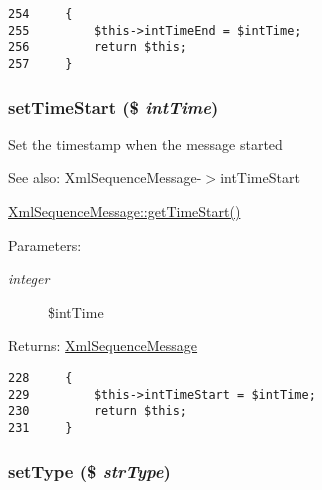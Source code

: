 \begin{Code}\begin{verbatim}254     {
255         $this->intTimeEnd = $intTime;
256         return $this;
257     }
\end{verbatim}
\end{Code}


\hypertarget{class_xml_sequence_message_60d6f4557ab43800fe80fb113d0ccc1c}{
\subsubsection[{setTimeStart}]{\setlength{\rightskip}{0pt plus 5cm}setTimeStart (\$ {\em intTime})}}
\label{class_xml_sequence_message_60d6f4557ab43800fe80fb113d0ccc1c}


Set the timestamp when the message started

\begin{Desc}
\item[See also:]XmlSequenceMessage-$>$intTimeStart 

\hyperlink{class_xml_sequence_message_bb950915c967cab83e55f46db3d44169}{XmlSequenceMessage::getTimeStart()} \end{Desc}
\begin{Desc}
\item[Parameters:]
\begin{description}
\item[{\em integer}]\$intTime \end{description}
\end{Desc}
\begin{Desc}
\item[Returns:]\hyperlink{class_xml_sequence_message}{XmlSequenceMessage} \end{Desc}


\begin{Code}\begin{verbatim}228     {
229         $this->intTimeStart = $intTime;
230         return $this;
231     }
\end{verbatim}
\end{Code}


\hypertarget{class_xml_sequence_message_48d409343c54e747174ffaf5911b2cd9}{
\subsubsection[{setType}]{\setlength{\rightskip}{0pt plus 5cm}setType (\$ {\em strType})}}
\label{class_xml_sequence_message_48d409343c54e747174ffaf5911b2cd9}


